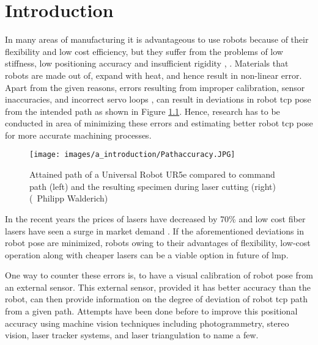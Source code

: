 \chapter{Introduction}\label{Chap:Introduction}

In many areas of manufacturing it is advantageous to use robots because of their flexibility and low cost efficiency, but they suffer from the problems of low stiffness, low positioning accuracy and insufficient rigidity \cite{ji}, \cite{chen}. Materials that robots are made out of, expand with heat, and hence result in non-linear error. Apart from the given reasons, errors resulting from improper calibration, sensor inaccuracies, and incorrect servo loops \cite{greenway}, \cite{torgny} can result in deviations in robot \Gls{tcp} pose from the intended path as shown in Figure \ref{fig:fig_walderich}. Hence, research has to be conducted in area of minimizing these errors and estimating better robot \Gls{tcp} pose for more accurate machining processes.

\vspace{5mm}


    \vspace{5mm}
    \begin{figure}[h]
        \centering
        \texttt{[image: images/a\_introduction/Pathaccuracy.JPG]}
        \caption{Attained path of a Universal Robot UR5e compared to command path (left) and the resulting specimen during laser cutting (right) (\textcopyright \ Philipp Walderich) \cite{img_walderich}}
        \label{fig:fig_walderich}
    \end{figure}
    \vspace{5mm}

    \noindent In the recent years the prices of lasers have decreased by 70\% and low cost fiber lasers have seen a surge in market demand \cite{optech}. If the aforementioned deviations in robot pose are minimized, robots owing to their advantages of flexibility, low-cost operation along with cheaper lasers can be a viable option in future of \gls{lmp}.
    
    \vspace{5mm}

    \noindent One way to counter these errors is, to have a visual calibration of robot pose from an external sensor. This external sensor, provided it has better accuracy than the robot, can then provide information on the degree of deviation of robot \gls{tcp} path from a given path. Attempts have been done before to improve this positional accuracy using machine vision techniques including photogrammetry, stereo vision, laser tracker systems, and laser triangulation to name a few. 
    
